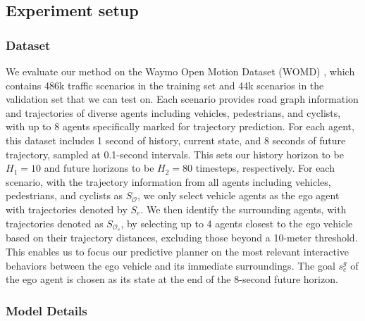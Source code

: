 \subsection{Experiment setup}

\subsubsection{\textbf{Dataset}}

We evaluate our method on the Waymo Open Motion Dataset (WOMD) \citep{ettinger2021large}, which contains 486k traffic scenarios in the training set and 44k scenarios in the validation set that we can test on.
Each scenario provides road graph information and trajectories of diverse agents including vehicles, pedestrians, and cyclists, with up to 8 agents specifically marked for trajectory prediction.
For each agent, this dataset includes 1 second of history, current state, and 8 seconds of future trajectory, sampled at 0.1-second intervals.
This sets our history horizon to be $H_1=10$ and future horizons to be $H_2=80$ timesteps, respectively.
For each scenario, with the trajectory information from all agents including vehicles, pedestrians, and cyclists as $S_{\mathcal{O}}$, we only select vehicle agents as the ego agent with trajectories denoted by $S_e$. 
We then identify the surrounding agents, with trajectories denoted as $S_{\mathcal{O}_s}$, by selecting up to 4 agents closest to the ego vehicle based on their trajectory distances, excluding those beyond a 10-meter threshold.
This enables us to focus our predictive planner on the most relevant interactive behaviors between the ego vehicle and its immediate surroundings.
The goal $s_e^g$ of the ego agent is chosen as its state at the end of the 8-second future horizon.

\subsubsection{\textbf{Model Details}}

